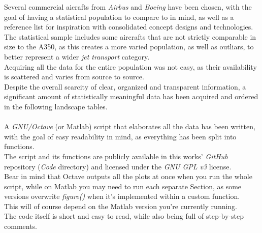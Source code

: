 \documentclass{article}
\begin{document}
Several commercial aicrafts from \textit{Airbus} and \textit{Boeing} have been chosen, with
the goal of having a statistical population to compare to in mind, as well as a reference list for 
inspiration with consolidated concept designs and technologies.
The statistical sample includes some aircrafts that are not strictly comparable in size to the A350, as this
creates a more varied population, as well as outliars, to better represent a wider \textit{jet transport} category.\\
Acquiring all the data for the entire population was not easy, as their availability is scattered and varies from source
to source.\\
Despite the overall scarcity of clear, organized and transparent information, a significant amount of statistically meaningful
data has been acquired and ordered in the following landscape tables.\\ \\ 
A \textit{GNU/Octave} \autocite{Octave} (or Matlab) script that elaborates all the data has been written, with the goal
of easy readability in mind, as everything has been split into functions. \\
The script and its functions are publicly available in this works' \textit{GitHub} repository \autocite{Airbus_replacement_repo} (\textit{Code} directory) and 
licensed under the \textit{GNU GPL v3} license.\\ 
Bear in mind that Octave outputs all the plots at once when you run the whole script, while on Matlab
you may need to run each separate Section, as some versions overwrite \textit{figure()} when it's implemented
within a custom function.\\ 
This will of course depend on the Matlab version you're currently running.\\ The code itself is short and easy to read,
while also being full of step-by-step comments.


\newpage
\end{document}
